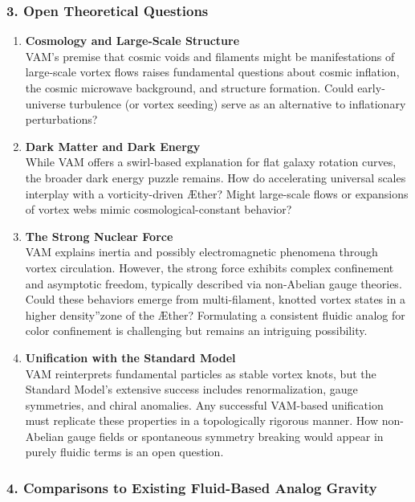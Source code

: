 \subsubsection*{3. Open Theoretical Questions}

\begin{enumerate}
    \item \textbf{Cosmology and Large-Scale Structure} \\
    VAM's premise that cosmic voids and filaments might be manifestations of large-scale vortex flows raises fundamental questions about cosmic inflation, the cosmic microwave background, and structure formation. Could early-universe turbulence (or vortex seeding) serve as an alternative to inflationary perturbations?

    \item \textbf{Dark Matter and Dark Energy} \\
    While VAM offers a swirl-based explanation for flat galaxy rotation curves, the broader dark energy puzzle remains. How do accelerating universal scales interplay with a vorticity-driven Æther? Might large-scale flows or expansions of vortex webs mimic cosmological-constant behavior?

    \item \textbf{The Strong Nuclear Force} \\
    VAM explains inertia and possibly electromagnetic phenomena through vortex circulation. However, the strong force exhibits complex confinement and asymptotic freedom, typically described via non-Abelian gauge theories. Could these behaviors emerge from multi-filament, knotted vortex states in a higher \grqq density\textquotedblright zone of the Æther? Formulating a consistent fluidic analog for color confinement is challenging but remains an intriguing possibility.

    \item \textbf{Unification with the Standard Model} \\
    VAM reinterprets fundamental particles as stable vortex knots, but the Standard Model's extensive success includes renormalization, gauge symmetries, and chiral anomalies. Any successful VAM-based unification must replicate these properties in a topologically rigorous manner. How non-Abelian gauge fields or spontaneous symmetry breaking would appear in purely fluidic terms is an open question.
\end{enumerate}

\subsubsection*{4. Comparisons to Existing Fluid-Based Analog Gravity}

